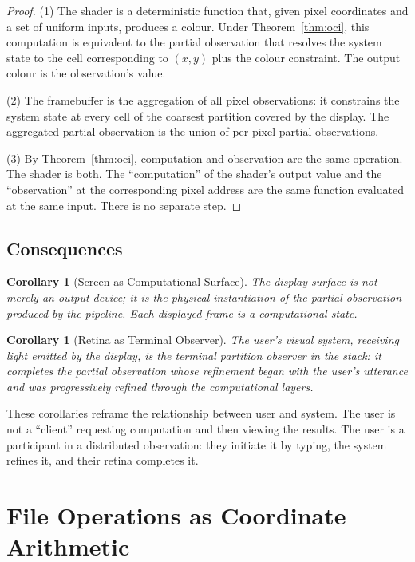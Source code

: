 \documentclass[11pt,a4paper]{article}
\newtheorem{corollary}[theorem]{Corollary}
\theoremstyle{definition}
\theoremstyle{remark}
\begin{document}
\begin{proof}
(1) The shader is a deterministic function that, given pixel coordinates and a set of uniform inputs, produces a colour. Under Theorem~\ref{thm:oci}, this computation is equivalent to the partial observation that resolves the system state to the cell corresponding to $(x,y)$ plus the colour constraint. The output colour is the observation's value.

(2) The framebuffer is the aggregation of all pixel observations: it constrains the system state at every cell of the coarsest partition covered by the display. The aggregated partial observation is the union of per-pixel partial observations.

(3) By Theorem~\ref{thm:oci}, computation and observation are the same operation. The shader is both. The ``computation'' of the shader's output value and the ``observation'' at the corresponding pixel address are the same function evaluated at the same input. There is no separate step.
\end{proof}

\subsection{Consequences}

\begin{corollary}[Screen as Computational Surface]
\label{cor:screen}
The display surface is not merely an output device; it is the physical instantiation of the partial observation produced by the pipeline. Each displayed frame is a computational state.
\end{corollary}

\begin{corollary}[Retina as Terminal Observer]
\label{cor:retina}
The user's visual system, receiving light emitted by the display, is the terminal partition observer in the stack: it completes the partial observation whose refinement began with the user's utterance and was progressively refined through the computational layers.
\end{corollary}

These corollaries reframe the relationship between user and system. The user is not a ``client'' requesting computation and then viewing the results. The user is a participant in a distributed observation: they initiate it by typing, the system refines it, and their retina completes it.

\section{File Operations as Coordinate Arithmetic}
\label{sec:files}
\end{document}
